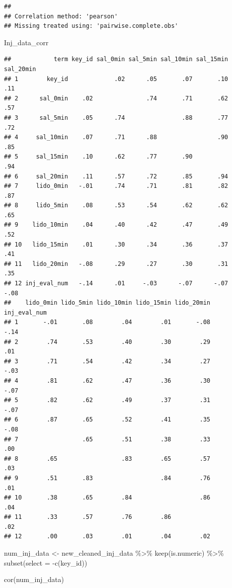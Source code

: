 \documentclass[
]{article}
\newenvironment{Shaded}{\begin{snugshade}}{\end{snugshade}}
\newcommand{\AttributeTok}[1]{\textcolor[rgb]{0.77,0.63,0.00}{#1}}
\newcommand{\FunctionTok}[1]{\textcolor[rgb]{0.00,0.00,0.00}{#1}}
\newcommand{\NormalTok}[1]{#1}
\newcommand{\OtherTok}[1]{\textcolor[rgb]{0.56,0.35,0.01}{#1}}
\newcommand{\SpecialCharTok}[1]{\textcolor[rgb]{0.00,0.00,0.00}{#1}}
\begin{document}
\begin{verbatim}
## 
## Correlation method: 'pearson'
## Missing treated using: 'pairwise.complete.obs'
\end{verbatim}

\begin{Shaded}
\begin{Highlighting}[]
\NormalTok{Inj\_data\_corr}
\end{Highlighting}
\end{Shaded}

\begin{verbatim}
##            term key_id sal_0min sal_5min sal_10min sal_15min sal_20min
## 1        key_id             .02      .05       .07       .10       .11
## 2      sal_0min    .02               .74       .71       .62       .57
## 3      sal_5min    .05      .74                .88       .77       .72
## 4     sal_10min    .07      .71      .88                 .90       .85
## 5     sal_15min    .10      .62      .77       .90                 .94
## 6     sal_20min    .11      .57      .72       .85       .94          
## 7     lido_0min   -.01      .74      .71       .81       .82       .87
## 8     lido_5min    .08      .53      .54       .62       .62       .65
## 9    lido_10min    .04      .40      .42       .47       .49       .52
## 10   lido_15min    .01      .30      .34       .36       .37       .41
## 11   lido_20min   -.08      .29      .27       .30       .31       .35
## 12 inj_eval_num   -.14      .01     -.03      -.07      -.07      -.08
##    lido_0min lido_5min lido_10min lido_15min lido_20min inj_eval_num
## 1       -.01       .08        .04        .01       -.08         -.14
## 2        .74       .53        .40        .30        .29          .01
## 3        .71       .54        .42        .34        .27         -.03
## 4        .81       .62        .47        .36        .30         -.07
## 5        .82       .62        .49        .37        .31         -.07
## 6        .87       .65        .52        .41        .35         -.08
## 7                  .65        .51        .38        .33          .00
## 8        .65                  .83        .65        .57          .03
## 9        .51       .83                   .84        .76          .01
## 10       .38       .65        .84                   .86          .04
## 11       .33       .57        .76        .86                     .02
## 12       .00       .03        .01        .04        .02
\end{verbatim}

\begin{Shaded}
\begin{Highlighting}[]
\NormalTok{num\_inj\_data }\OtherTok{\textless{}{-}}\NormalTok{ new\_cleaned\_inj\_data }\SpecialCharTok{\%\textgreater{}\%}
  \FunctionTok{keep}\NormalTok{(is.numeric) }\SpecialCharTok{\%\textgreater{}\%} \FunctionTok{subset}\NormalTok{(}\AttributeTok{select =} \SpecialCharTok{{-}}\FunctionTok{c}\NormalTok{(key\_id))}

\FunctionTok{cor}\NormalTok{(num\_inj\_data)}
\end{Highlighting}
\end{Shaded}
\end{document}
